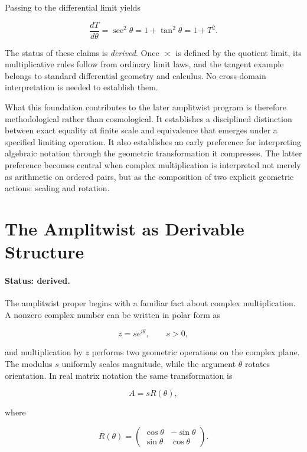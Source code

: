 \documentclass[11pt]{article}
\newcommand{\ulteq}{\mathrel{\text{≍}}}
\begin{document}
Passing to the differential limit yields

\begin{equation}
\frac{dT}{d\theta}
=
\sec^2\theta
=
1+\tan^2\theta
=
1+T^2.
\end{equation}

The status of these claims is \emph{derived}. Once $\ulteq$ is defined by the quotient limit, its multiplicative rules follow from ordinary limit laws, and the tangent example belongs to standard differential geometry and calculus. No cross-domain interpretation is needed to establish them.

What this foundation contributes to the later amplitwist program is therefore methodological rather than cosmological. It establishes a disciplined distinction between exact equality at finite scale and equivalence that emerges under a specified limiting operation. It also establishes an early preference for interpreting algebraic notation through the geometric transformation it compresses. The latter preference becomes central when complex multiplication is interpreted not merely as arithmetic on ordered pairs, but as the composition of two explicit geometric actions: scaling and rotation.

\section{The Amplitwist as Derivable Structure}

\paragraph{Status: derived.}

The amplitwist proper begins with a familiar fact about complex multiplication. A nonzero complex number can be written in polar form as

\begin{equation}
z=s e^{i\theta},
\qquad s>0,
\end{equation}

and multiplication by $z$ performs two geometric operations on the complex plane. The modulus $s$ uniformly scales magnitude, while the argument $\theta$ rotates orientation. In real matrix notation the same transformation is

\begin{equation}
A=sR(\theta),
\end{equation}

where

\begin{equation}
R(\theta)
=
\begin{pmatrix}
\cos\theta & -\sin\theta\\
\sin\theta & \cos\theta
\end{pmatrix}.
\end{equation}
\end{document}
